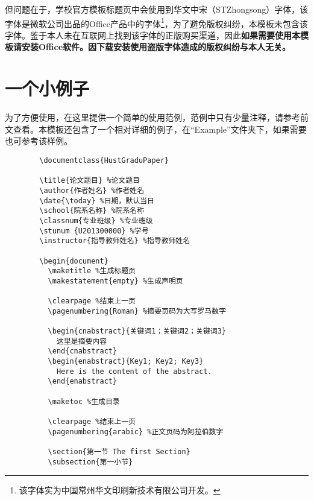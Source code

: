 \documentclass[UTF8]{ctexart}
\begin{document}
	但问题在于，学校官方模板标题页中会使用到华文中宋（STZhongsong）字体，该字体是微软\textsuperscript{\textregistered}公司出品的Office产品中的字体\footnote{该字体实为中国常州华文印刷新技术有限公司\textsuperscript{\texttrademark}开发。}，为了避免版权纠纷，本模板未包含该字体。鉴于本人未在互联网上找到该字体的正版购买渠道，因此{\bfseries 如果需要使用本模板请安装Office软件。因下载安装使用盗版字体造成的版权纠纷与本人无关。}
	
	\section{一个小例子}\label{sec:example}
	为了方便使用，在这里提供一个简单的使用范例，范例中只有少量注释，请参考前文查看。本模板还包含了一个相对详细的例子，在“Example”文件夹下，如果需要也可参考该样例。
	\begin{verbatim}
		\documentclass{HustGraduPaper}
		
		\title{论文题目} %论文题目
		\author{作者姓名} %作者姓名
		\date{\today} %日期，默认当日
		\school{院系名称} %院系名称
		\classnum{专业班级} %专业班级
		\stunum {U201300000} %学号
		\instructor{指导教师姓名} %指导教师姓名
		
		\begin{document}
		  \maketitle %生成标题页
		  \makestatement{empty} %生成声明页
		  
		  \clearpage %结束上一页
		  \pagenumbering{Roman} %摘要页码为大写罗马数字
		  
		  \begin{cnabstract}{关键词1；关键词2；关键词3}
		    这里是摘要内容
		  \end{cnabstract}
		  \begin{enabstract}{Key1; Key2; Key3}
		    Here is the content of the abstract.
		  \end{enabstract}
		  
		  \maketoc %生成目录
		  
		  \clearpage %结束上一页
		  \pagenumbering{arabic} %正文页码为阿拉伯数字
		  
		  \section{第一节 The first Section}
		  \subsection{第一小节}

\end{verbatim}
\end{document}

